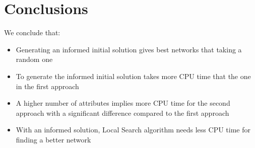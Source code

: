 \section{Conclusions}
\label{sec:conclusions}

We conclude that:
\begin{itemize}
	\item Generating an informed initial solution gives best networks that taking a random one
	\item To generate the informed initial solution takes more CPU time that the one in the first approach
	\item A higher number of attributes implies more CPU time for the second approach with a significant difference compared to the first approach
	\item With an informed solution, Local Search algorithm needs less CPU time for finding a better network
\end{itemize}